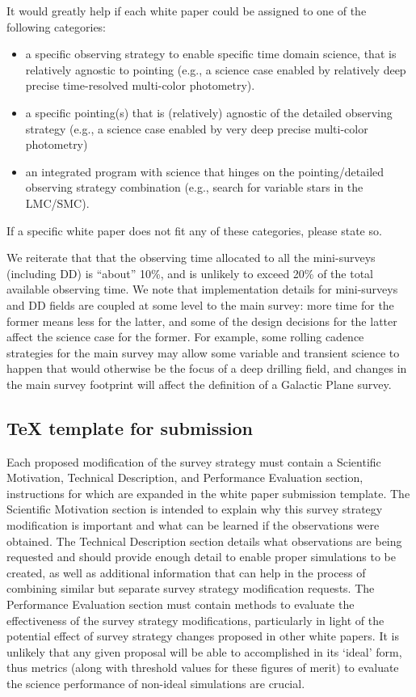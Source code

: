 \documentclass[DM,lsstdraft,toc,usenatbib]{lsstdoc}
\begin{document}
It would greatly help if each white paper could be assigned to one of the following
categories:  
\begin{itemize} 
\item a specific observing strategy to enable specific time domain science, 
	that is relatively agnostic to pointing (e.g., a science case enabled 
	by relatively deep precise time-resolved multi-color photometry). 
\item a specific pointing(s) that is (relatively) agnostic of the detailed observing 
	strategy (e.g., a science case enabled by very deep precise multi-color 
	photometry) 
\item an integrated program with science that hinges on the pointing/detailed 
	observing strategy combination (e.g., search for variable stars in the 
	LMC/SMC). 
\end{itemize}  
If a specific white paper does not fit any of these categories, please state so.

We reiterate that that the observing time allocated to all the mini-surveys 
(including DD) is ``about'' 10\%, and is unlikely to exceed 20\% of the total available
observing time. We note that implementation details for mini-surveys and DD fields 
are coupled at some level to the main survey: more time for the former means less 
for the latter, and some of the design decisions for the latter affect the science
case for the former.  For example, some rolling cadence strategies for the main survey  
may allow some variable and transient science to happen that would otherwise be the 
focus of a deep drilling field, and changes in the main survey footprint will affect the 
definition of a Galactic Plane survey. 


\subsection{TeX template for submission} 

Each proposed modification of the survey strategy must contain a Scientific Motivation, Technical Description, and Performance Evaluation section, instructions for which are expanded in the white paper submission template. The Scientific Motivation section is intended to explain why this survey strategy modification is important and what can be learned if the observations were obtained. The Technical Description section details what observations are being requested and should provide enough detail to enable proper simulations to be created, as well as additional information that can help in the process of combining similar but separate survey strategy modification requests. The Performance Evaluation section must contain methods to evaluate the effectiveness of the survey strategy modifications, particularly in light of the potential effect of survey strategy changes proposed in other white papers. It is unlikely that any given proposal will be able to accomplished in its `ideal' form, thus metrics (along with threshold values for these figures of merit) to evaluate the science performance of non-ideal simulations are crucial. 
\end{document}
